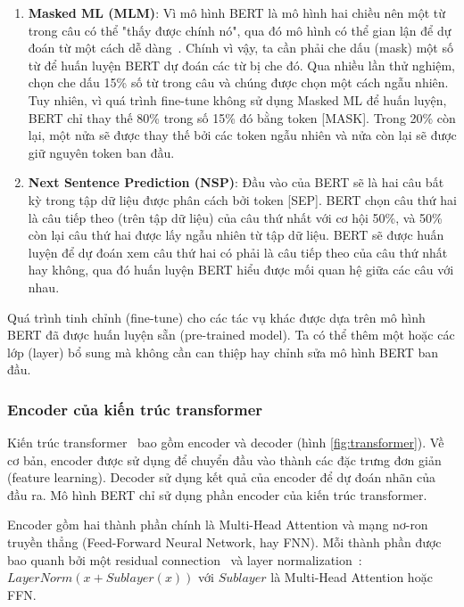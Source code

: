 \begin{enumerate}
	\item \textbf{Masked ML (MLM)}:
		Vì mô hình BERT là mô hình hai chiều nên một từ trong câu có thể "thấy
		được chính nó", qua đó mô hình có thể gian lận để dự đoán từ một cách
		dễ dàng~\cite{devlinBERTPretrainingDeep2019}. Chính vì vậy, ta cần phải
		che dấu (mask) một số từ để huấn luyện BERT dự đoán các từ bị che đó.
		Qua nhiều lần thử nghiệm, \cite{devlinBERTPretrainingDeep2019} chọn che
		dấu 15\% số từ trong câu và chúng được chọn một cách ngẫu nhiên. Tuy
		nhiên, vì quá trình fine-tune không sử dụng Masked ML để huấn luyện,
		BERT chỉ thay thế 80\% trong số 15\% đó bằng token [MASK]. Trong 20\%
		còn lại, một nửa sẽ được thay thế bởi các token ngẫu nhiên và nửa còn
		lại sẽ được giữ nguyên token ban đầu.
	\item \textbf{Next Sentence Prediction (NSP)}: Đầu vào của BERT sẽ là hai
		câu bất kỳ trong tập dữ liệu được phân cách bởi token [SEP]. BERT chọn
		câu thứ hai là câu tiếp theo (trên tập dữ liệu) của câu thứ nhất với cơ
		hội 50\%, và 50\% còn lại câu thứ hai được lấy ngẫu nhiên từ tập dữ
		liệu. BERT sẽ được huấn luyện để dự đoán xem câu thứ hai có phải là câu
		tiếp theo của câu thứ nhất hay không, qua đó huấn luyện BERT hiểu được
		mối quan hệ giữa các câu với nhau.
\end{enumerate}

Quá trình tinh chỉnh (fine-tune) cho các tác vụ khác được dựa trên mô hình BERT
đã được huấn luyện sẵn (pre-trained model). Ta có thể thêm một hoặc các lớp
(layer) bổ sung mà không cần can thiệp hay chỉnh sửa mô hình BERT ban đầu.

\subsubsection{Encoder của kiến trúc transformer} Kiến trúc
transformer~\cite{vaswaniAttentionAllYou2017} bao gồm encoder và decoder
(hình \ref{fig:transformer}). Về cơ bản, encoder được sử dụng để chuyển đầu vào
thành các đặc trưng đơn giản (feature learning). Decoder sử dụng kết quả của
encoder để dự đoán nhãn của đầu ra. Mô hình BERT chỉ sử dụng phần encoder của
kiến trúc transformer.


Encoder gồm hai thành phần chính là Multi-Head Attention và mạng nơ-ron truyền
thẳng (Feed-Forward Neural Network, hay FNN). Mỗi thành phần được bao quanh bởi
một residual connection~\cite{heDeepResidualLearning2016} và layer
normalization~\cite{baLayerNormalization2016}: $LayerNorm(x + Sublayer(x))$ với
$Sublayer$ là Multi-Head Attention hoặc FFN.


